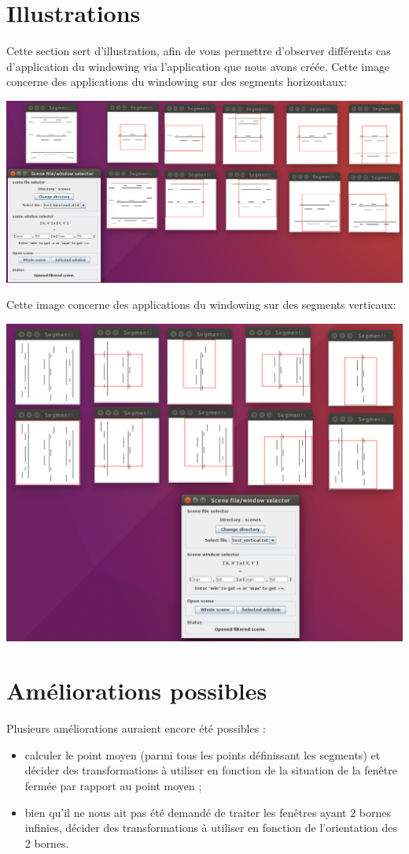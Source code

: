 \documentclass[10pt,a4paper]{article}
\begin{document}
\section{Illustrations}
Cette section sert d'illustration, afin de vous permettre d'observer différents cas d'application du windowing via l'application que nous avons créée.
Cette image concerne des applications du windowing sur des segments horizontaux:

\includegraphics[scale=0.25]{images/test_horizontal.png}

Cette image concerne des applications du windowing sur des segments verticaux:

\includegraphics[scale=0.25]{images/test_vertical.png}

\section{Améliorations possibles}
Plusieurs améliorations auraient encore été possibles :
\begin{itemize}
	\item calculer le point moyen (parmi tous les points définissant les segments) et décider des transformations à utiliser en fonction de la situation de la fenêtre fermée par rapport au point moyen ;
	\item bien qu'il ne nous ait pas été demandé de traiter les fenêtres ayant 2 bornes infinies, décider des transformations à utiliser en fonction de l'orientation des 2 bornes.
\end{itemize}
\end{document}
